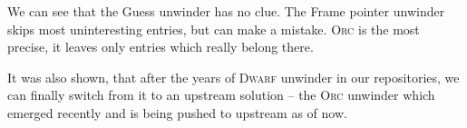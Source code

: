 \documentclass[10pt]{llncs}
\newcommand{\dwarf}{\textsc{Dwarf}\xspace}
\newcommand{\orc}{\textsc{Orc}\xspace}
\begin{document}
We can see that the Guess unwinder has no clue. The Frame pointer unwinder
skips most uninteresting entries, but can make a mistake. \orc is the most
precise, it leaves only entries which really belong there.

It was also shown, that after the years of \dwarf unwinder in our
repositories, we can finally switch from it to an upstream solution -- the
\orc unwinder which emerged recently and is being pushed to upstream as of
now.



\end{document}
